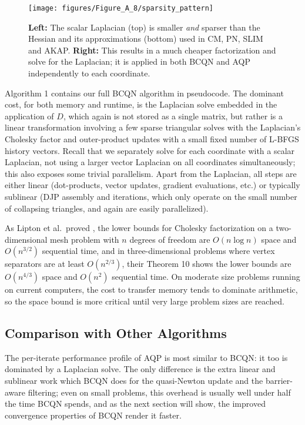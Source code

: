 
\begin{figure}
\centering
\texttt{[image: figures/Figure\_A\_8/sparsity\_pattern]}
\caption{ {\bf Left:} The scalar Laplacian (top) is smaller \emph{and} sparser than the
Hessian and its approximations (bottom) used in CM, PN, SLIM and AKAP. {\bf Right:} This results in a much cheaper factorization and solve for the Laplacian; it
is applied in both BCQN and AQP independently to each coordinate.}
\label{fig:sparsity_pattern}
\end{figure}

Algorithm 1 contains our full BCQN algorithm in pseudocode. The
dominant cost, for both memory and runtime, is the Laplacian solve
embedded in the application of $D$, which again is not stored as a
single matrix, but rather is a linear transformation involving a
few sparse triangular solves with the Laplacian's Cholesky factor
and outer-product updates with a small fixed number of L-BFGS history
vectors. Recall that we separately solve for each coordinate with
a scalar Laplacian, not using a larger vector Laplacian on all
coordinates simultaneously; this also exposes some trivial parallelism.
Apart from the Laplacian, all steps are either linear (dot-products,
vector updates, gradient evaluations, etc.) or typically sublinear
(DJP assembly and iterations, which only operate on the small number
of collapsing triangles, and again are easily parallelized).

As Lipton et al.\ proved ,
the lower bounds for Cholesky factorization on a two-dimensional
mesh problem with $n$ degrees of freedom are $O(n \log n)$ space
and $O(n^{3/2})$ sequential time, and in three-dimensional problems 
where vertex separators are at least $O(n^{2/3})$, their Theorem
10 shows the lower bounds are $O(n^{4/3})$ space and $O(n^2)$
sequential time. On moderate size problems running on current
computers, the cost to transfer memory tends to dominate arithmetic,
so the space bound is more critical until very large problem sizes
are reached.


\subsection{Comparison with Other Algorithms}

The per-iterate performance profile of AQP is most similar to BCQN:
it too is dominated by a Laplacian solve. The only difference is
the extra linear and sublinear work which BCQN does for the quasi-Newton
update and the barrier-aware filtering; even on small problems, this
overhead is usually well under half the time BCQN spends, and as the
next section will show, the improved convergence properties of BCQN
render it faster.

